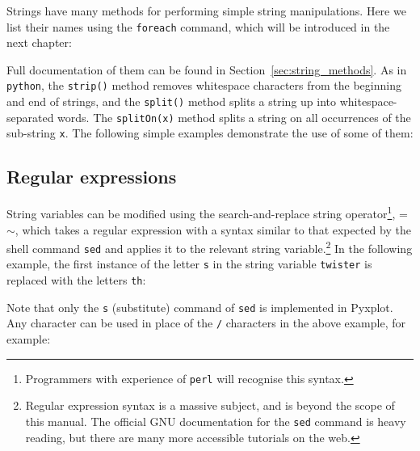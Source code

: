 Strings have many methods for performing simple string manipulations. Here we
list their names using the {\tt foreach} command, which will be introduced in
the next chapter:

\vspace{3mm}

\vspace{3mm}

\noindent Full documentation of them can be found in
Section~\ref{sec:string_methods}. As in {\tt python}, the {\tt strip()} method
removes whitespace characters from the beginning and end of strings, and the
{\tt split()} method splits a string up into whitespace-separated words. The
{\tt splitOn(x)} method splits a string on all occurrences of the sub-string
{\tt x}.  The following simple examples demonstrate the use of some of them:

\vspace{3mm}

\vspace{3mm}

\vspace{3mm}

\vspace{3mm}

\subsection{Regular expressions}

String variables can be modified using the search-and-replace string
operator\footnote{Programmers with
experience of {\tt perl} will recognise this syntax.}, =$\sim$, which takes a regular expression with a syntax similar to that
expected by the shell command {\tt sed} and applies it to the relevant string variable.\footnote{Regular
expression syntax is a massive subject, and is beyond the scope of this manual.
The official GNU documentation for the {\tt sed} command is heavy reading, but
there are many more accessible tutorials on the web.} In the following example, the first instance of the letter {\tt s} in
the string variable {\tt twister} is replaced with the letters {\tt th}:

\vspace{3mm}

\vspace{3mm}

Note that only the {\tt s} (substitute) command of {\tt sed} is implemented in
Pyxplot. Any character can be used in place of the {\tt /} characters in the
above example, for example:

